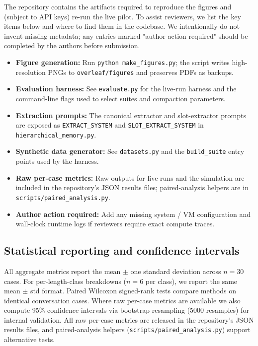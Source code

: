 \documentclass[conference]{IEEEtran}
\begin{document}
The repository contains the artifacts required to reproduce the figures and (subject to API keys) re-run the live pilot. To assist reviewers, we list the key items below and where to find them in the codebase. We intentionally do not invent missing metadata; any entries marked "author action required" should be completed by the authors before submission.

\begin{itemize}
    \item \textbf{Figure generation:} Run \texttt{python make\_figures.py}; the script writes high-resolution PNGs to \texttt{overleaf/figures} and preserves PDFs as backups.
    \item \textbf{Evaluation harness:} See \texttt{evaluate.py} for the live-run harness and the command-line flags used to select suites and compaction parameters.
    \item \textbf{Extraction prompts:} The canonical extractor and slot-extractor prompts are exposed as \texttt{EXTRACT\_SYSTEM} and \texttt{SLOT\_EXTRACT\_SYSTEM} in \texttt{hierarchical\_memory.py}.
    \item \textbf{Synthetic data generator:} See \texttt{datasets.py} and the \texttt{build\_suite} entry points used by the harness.
    \item \textbf{Raw per-case metrics:} Raw outputs for live runs and the simulation are included in the repository's JSON results files; paired-analysis helpers are in \texttt{scripts/paired\_analysis.py}.
    \item \textbf{Author action required:} Add any missing system / VM configuration and wall-clock runtime logs if reviewers require exact compute traces.
\end{itemize}

\subsection{Statistical reporting and confidence intervals}

All aggregate metrics report the mean $\pm$ one standard deviation across $n=30$ cases. For per-length-class breakdowns ($n=6$ per class), we report the same mean $\pm$ std format. Paired Wilcoxon signed-rank tests compare methods on identical conversation cases. Where raw per-case metrics are available we also compute 95\% confidence intervals via bootstrap resampling (5000 resamples) for internal validation. All raw per-case metrics are released in the repository's JSON results files, and paired-analysis helpers (\texttt{scripts/paired\_analysis.py}) support alternative tests.
\end{document}
